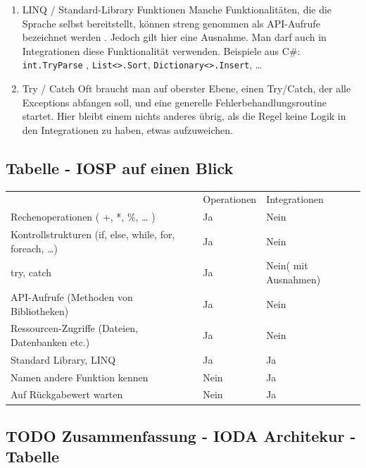 \documentclass[11pt]{article}
\begin{document}
\begin{enumerate}
\item LINQ / Standard-Library Funktionen
\label{sec:orgheadline38}
Manche Funktionalitäten, die die Sprache selbst bereitstellt, können streng genommen als API-Aufrufe bezeichnet werden
. Jedoch gilt hier eine Ausnahme. Man darf auch in Integrationen diese Funktionalität verwenden.
Beispiele aus C\#:
\texttt{int.TryParse} , \texttt{List<>.Sort}, \texttt{Dictionary<>.Insert}, \ldots{}

\item Try / Catch
\label{sec:orgheadline39}
Oft braucht man auf oberster Ebene, einen Try/Catch, der alle Exceptions abfangen soll, und eine generelle Fehlerbehandlungsroutine
startet. Hier bleibt einem nichts anderes übrig, als die Regel keine Logik in den Integrationen zu haben, etwas aufzuweichen.
\end{enumerate}


\subsection{Tabelle -  IOSP auf einen Blick}
\label{sec:orgheadline42}


\begin{center}
\begin{tabular}{lll}
 & Operationen & Integrationen\\
Rechenoperationen ( +, *, \%, \ldots{} ) & Ja & Nein\\
Kontrollstrukturen (if, else, while, for, foreach, \ldots{}) & Ja & Nein\\
try, catch & Ja & Nein( mit Ausnahmen)\\
API-Aufrufe (Methoden von Bibliotheken) & Ja & Nein\\
Ressourcen-Zugriffe (Dateien, Datenbanken etc.) & Ja & Nein\\
Standard Library, LINQ & Ja & Ja\\
Namen andere Funktion kennen & Nein & Ja\\
Auf Rückgabewert warten & Nein & Ja\\
\end{tabular}
\end{center}

\subsection{{\bfseries\sffamily TODO} Zusammenfassung - IODA Architekur -  Tabelle}
\label{sec:orgheadline43}
\end{document}
